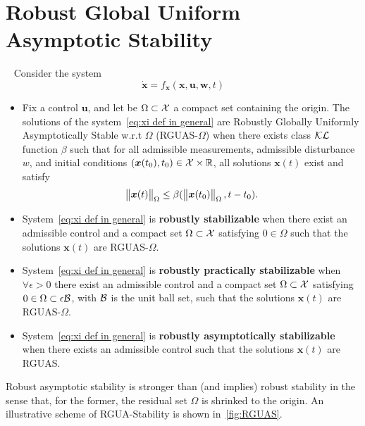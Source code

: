 \section{Robust Global Uniform Asymptotic Stability}
\begin{definition}\label{def:RGUAS}
~\cite{freeman1994cdc,freeman1996bookRobustNNlinearControl} Consider the system
\begin{equation}\label{eq:xi def in general}
	\bm{\dot{x}} =f_{\bm{x}}(\bm{x},\bm{u},\bm{w},t)
\end{equation}
\begin{itemize}
	\item Fix a control $\bm{u}$, and let be $\Omega\subset \cal X$ a compact set containing the origin. The solutions of the system~\cref{eq:xi def in general} are Robustly Globally Uniformly Asymptotically Stable w.r.t $\Omega$ (RGUAS-$\Omega$) when there exists class ${\cal KL}$ function $\beta$ such that for all admissible measurements, admissible disturbance $w$, and initial conditions $(\bm{x}(t_0),t_0)\in {\cal X}\times\mathbb{R}$, all solutions $\bm{x}(t)$ exist and satisfy
	\begin{equation}\label{eq:def of RGUAS-omega}
		\begin{Vmatrix} \bm{x}(t) \end{Vmatrix}_\Omega\leq \beta(\begin{Vmatrix} \bm{x}(t_0) \end{Vmatrix}_\Omega,t-t_0).
	\end{equation} 
	\item System~\cref{eq:xi def in general} is \textbf{robustly stabilizable} when there exist an admissible control and a compact set $\Omega\subset {\cal X}$ satisfying $0\in\Omega$ such that the solutions $\bm{x}(t)$ are RGUAS-$\Omega$.
	\item System~\cref{eq:xi def in general} is \textbf{robustly practically stabilizable} when $\forall \epsilon>0$ there exist an admissible control and a compact set $\Omega\subset{\cal X}$ satisfying $0\in\Omega\subset\epsilon \cal B$, with $\cal B$ is the unit ball set, such that the solutions  $\bm{x}(t)$ are RGUAS-$\Omega$.
	\item System~\cref{eq:xi def in general} is \textbf{robustly asymptotically stabilizable} when there exists an admissible control such that the solutions $\bm{x}(t)$ are RGUAS.
\end{itemize}
\end{definition}
Robust asymptotic stability is stronger than (and implies) robust stability in the sense that, for the former, the residual set $\Omega$ is shrinked to the origin.
An illustrative scheme of RGUA-Stability is shown in~\cref{fig:RGUAS}.

